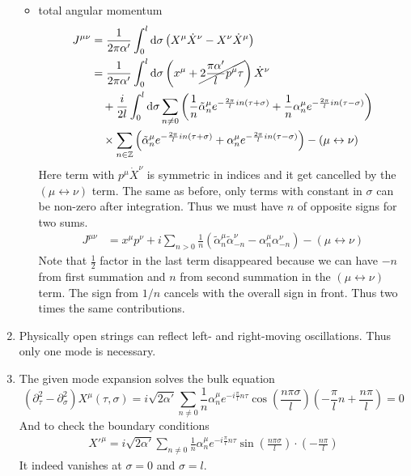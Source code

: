 \begin{enumerate}[label=(\alph*)]
\begin{itemize}
			\item total angular momentum
				\begin{align*}
					J^{\mu\nu} &= \frac{1}{2\pi\alpha'} \int_0^l \dd{\sigma} \left( X^\mu \dot{X}^\nu - X^\nu \dot{X}^\mu \right) \\
								  &= \frac{1}{2\pi\alpha'} \int_0^l \dd{\sigma} \left(x^\mu + \cancel{2 \frac{\pi\alpha'}{l} p^\mu \tau} \right) \dot{X}^\nu  \\
								  & \quad + \frac{i}{2 l }\int_0^l \dd{\sigma} \sum_{n\neq0} \left(  \frac{1}{n} \tilde{\alpha}_n^\mu e^{-\frac{2\pi}{l} i n (\tau + \sigma)} + \frac{1}{n} {\alpha}_n^\mu e^{-\frac{2\pi}{l} i n (\tau - \sigma)} \right) \\
								  &\quad \times \sum_{n \in \mathbb{Z}} \left(  \tilde{\alpha}^\mu_n e^{- \frac{2\pi}{l} i n (\tau+\sigma)}  + {\alpha}^\mu_n e^{- \frac{2\pi}{l} i n (\tau - \sigma)}  \right)  - (\mu \leftrightarrow \nu)
				\end{align*}
				Here term with $p^\mu \dot{X}^\nu$ is symmetric in indices and it get cancelled by the $(\mu \leftrightarrow \nu)$ term. The same as before, only terms with constant in $\sigma$ can be non-zero after integration. Thus we must have $n$ of opposite signs for two sums.
				\begin{align*}
					J^{\mu\nu} &= x^\mu p^\nu + i \sum_{n > 0} \frac{1}{n} \left( \tilde{\alpha}_{n}^\mu \tilde{\alpha}_{-n}^\nu  -  \alpha^\mu_n \alpha^\nu_{-n}\right) - (\mu \leftrightarrow \nu)
				\end{align*}
				Note that $\frac{1}{2}$ factor in the last term disappeared because we can have $-n$ from first summation and $n$ from second summation in the $(\mu \leftrightarrow \nu)$ term. The sign from $1/n$ cancels with the overall sign in front. Thus two times the same contributions.
		\end{itemize}

	\item Physically open strings can reflect left- and right-moving oscillations. Thus only one mode is necessary.

	\item The given mode expansion solves the bulk equation
		\begin{equation*}
			(\partial_\tau^2 - \partial_\sigma^2) X^\mu (\tau, \sigma) = i\sqrt{2\alpha'} \sum_{n\neq 0} \frac{1}{n } \alpha_n^\mu e^{-i \frac{\pi}{l} n \tau} \cos(\frac{n\pi\sigma}{l}) \left( - \frac{\pi}{l} n + \frac{n\pi}{l} \right) = 0
		\end{equation*}
		And to check the boundary conditions
		\begin{align*}
			X'^\mu = i\sqrt{2\alpha'} \sum_{n\neq 0} \frac{1}{n } \alpha_n^\mu e^{-i \frac{\pi}{l} n \tau} \sin(\frac{n\pi\sigma}{l}) \cdot \left(- \frac{n\pi}{l} \right)
		\end{align*}
		It indeed vanishes at $\sigma=0$ and $\sigma=l$.


\end{enumerate}
